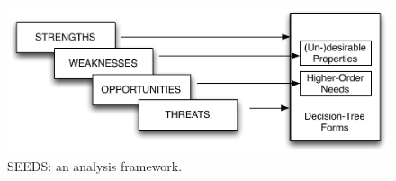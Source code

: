 \begin{figure}[h!]
    \includegraphics[width=5.4in]{fw.pdf}    %
\caption{\footnotesize SEEDS: an analysis framework.}\label{fwpic}
\end{figure}



%
